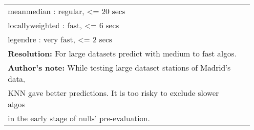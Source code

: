 \documentclass[a4paper]{article}
\begin{document}
\begin{longtable}{ll}
meanmedian      : regular,   <= 20 secs & \\[0pt]
locallyweighted : fast,      <=  6 secs & \\[0pt]
legendre        : very fast, <=  2 secs & \\[0pt]
\textbf{Resolution:} For large datasets predict with medium to fast algos. & \\[0pt]
\textbf{Author's note:} While testing large dataset stations of Madrid's data, & \\[0pt]
KNN gave better predictions. It is too risky to exclude slower algos & \\[0pt]
in the early stage of nulls' pre-evaluation. & \\[0pt]
\hline
\end{longtable}
\end{document}
